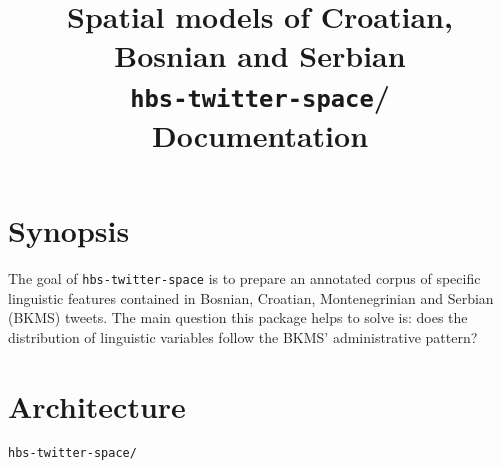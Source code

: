 \documentclass[a4paper]{article}
\title{Spatial models of Croatian, Bosnian and Serbian \\\texttt{hbs-twitter-space}/\\  \Large Documentation}
\begin{document}
\maketitle
\tableofcontents
\clearpage



\section{Synopsis}

The goal of \texttt{hbs-twitter-space} is to prepare an annotated corpus of specific linguistic features contained in Bosnian, Croatian, Montenegrinian and Serbian (BKMS) tweets. The main question this package helps to solve is: does the distribution of linguistic variables follow the BKMS' administrative pattern? 


\section{Architecture}

\texttt{hbs-twitter-space/}
\end{document}
